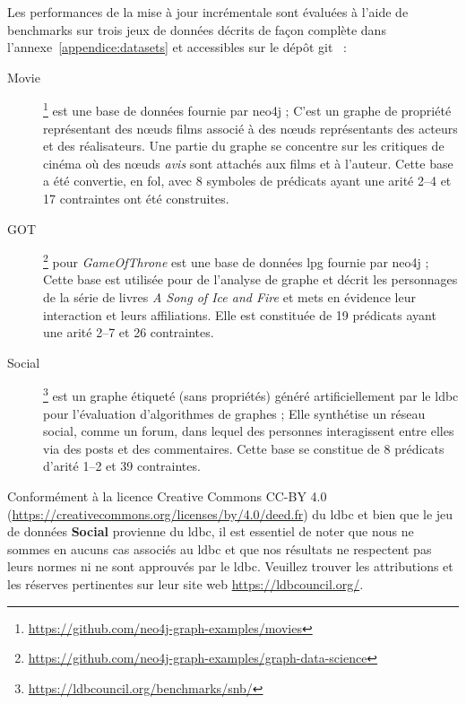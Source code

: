 Les performances de la mise à jour incrémentale sont évaluées à l'aide de benchmarks sur trois jeux de données décrits de façon complète dans l'annexe~\ref{appendice:datasets} et accessibles sur le dépôt \gls{git}~\cite{chabinDataFix2023} :
\begin{description}
    \item[Movie]\footnote{\url{https://github.com/neo4j-graph-examples/movies}} est une base de données fournie par \gls{neo4j} ;
          C'est un graphe de propriété représentant des nœuds films associé à des nœuds représentants des acteurs et des réalisateurs.
          Une partie du graphe se concentre sur les critiques de cinéma où des nœuds \emph{avis} sont attachés aux films et à l'auteur.
          Cette base a été convertie, en \gls{fol}, avec \num{8} symboles de prédicats ayant une arité \numrange{2}{4} et \num{17} contraintes ont été construites.
    \item[GOT]\footnote{\url{https://github.com/neo4j-graph-examples/graph-data-science}} pour \emph{GameOfThrone} est une base de données \gls{lpg} fournie par \gls{neo4j} ;
          Cette base est utilisée pour de l'analyse de graphe et décrit les personnages de la série de livres \emph{A Song of Ice and Fire} et mets en évidence leur interaction et leurs affiliations.
          Elle est constituée de \num{19} prédicats ayant une arité \numrange{2}{7} et \num{26} contraintes.
    \item[Social]\footnote{\url{https://ldbcouncil.org/benchmarks/snb/}} est un graphe étiqueté (sans propriétés) généré artificiellement par le \gls{ldbc} pour l'évaluation d'algorithmes de graphes ;
          Elle synthétise un réseau social, comme un forum, dans lequel des personnes interagissent entre elles via des posts et des commentaires.
          Cette base se constitue de \num{8} prédicats d'arité \numrange{1}{2} et \num{39} contraintes.
\end{description}

\begin{remark}
    Conformément à la licence Creative Commons CC-BY 4.0 (\url{https://creativecommons.org/licenses/by/4.0/deed.fr}) du \gls{ldbc} et bien que le jeu de données \textbf{Social} provienne du \gls{ldbc}, il est essentiel de noter que nous ne sommes en aucuns cas associés au \gls{ldbc} et que nos résultats ne respectent pas leurs normes ni ne sont approuvés par le \gls{ldbc}.
    Veuillez trouver les attributions et les réserves pertinentes sur leur site web \url{https://ldbcouncil.org/}.
\end{remark}

